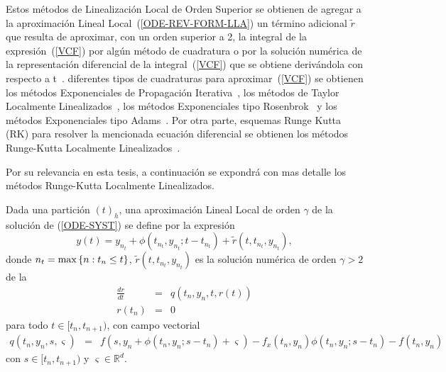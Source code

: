 Estos métodos de Linealización Local de Orden Superior se obtienen de agregar a la aproximación Lineal Local~(\ref{ODE-REV-FORM-LLA}) un término adicional $\widetilde{r}$ que resulta de aproximar, con un orden superior a 2, la integral de la expresión~(\ref{VCF}) por algún método de cuadratura o por la solución numérica de la representación diferencial de la integral~(\ref{VCF}) que se obtiene derivándola con respecto a t~\cite{delaCruz06}.  diferentes tipos de cuadraturas para aproximar~(\ref{VCF}) se obtienen los métodos Exponenciales de Propagación 
Iterativa~\cite{tokman2006efficient}, los métodos de Taylor Localmente Linealizados~\cite{delaCruz07}, los
métodos Exponenciales tipo Rosenbrok~\cite{hochbruck2009exponential} y los métodos Exponenciales tipo Adams~\cite{hochbruck2011exponential}. Por otra parte,  esquemas Runge Kutta (RK) para resolver la mencionada ecuación diferencial se obtienen los métodos Runge-Kutta Localmente Linealizados~\cite{delaCruz06,Jimenez13,Jimenez14AMC}.

Por su relevancia en esta tesis, a continuación se expondrá con mas detalle los métodos Runge-Kutta Localmente Linealizados. 

Dada una partición $(t)_{h}$, una aproximación Lineal Local de orden $%
\gamma$ de la solución de (\ref{ODE-SYST}) se define por la expresión~\cite{Jimenez13}
\begin{equation}
y(t)=y_{n_{t}}+\phi(t_{n_{t}},y_{n_{t}};t-t_{n_{t}})+\widetilde{r}(t,t_{n_{t}},y_{n_{t}}),
\label{ODE-REV-HOLL}
\end{equation}
donde ${n_{t}=\max\left\{ n:t_{n}\leq t \right\}}$, $\widetilde{r}(t,t_{n_{t}},y_{n_{t}})$ es la solución numérica de orden $\gamma >2$ de la 
\begin{eqnarray}
\frac{dr}{dt} & = & q(t_{n},y_{n},t,r(t))  \label{ODE r} \\
r(t_{n}) & = & 0 \nonumber
\end{eqnarray}
para todo $t\in [t_{n},t_{n+1})$, con campo vectorial 
\begin{eqnarray*}
q(t_n,y_n,s,\varsigma)&=&f(s,y_n+\phi(t_n,y_n;s-t_n)+\varsigma)-f_x(t_n,y_n)\phi(t_n,y_n;s-t_n)-f(t_n,y_n)%
\end{eqnarray*}
con $s\in [t_{n},t_{n+1})$ y $\varsigma \in \mathbb{R}^d $. 

